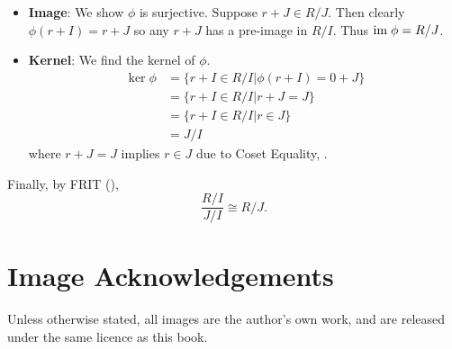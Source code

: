 \begin{questions}
\begin{partquestions}{\roman*}
\begin{itemize}
            \item \textbf{Image}: We show $\phi$ is surjective. Suppose $r + J \in R/J$. Then clearly $\phi(r+I) = r+J$ so any $r+J$ has a pre-image in $R/I$. Thus $\mathrm{im}\;\phi = R/J$.
            
            \item \textbf{Kernel}: We find the kernel of $\phi$.
            \begin{align*}
                \ker\phi &= \{r+I \in R/I \vert \phi(r+I) = 0+J\}\\
                &= \{r+I \in R/I \vert r+J = J\}\\
                &= \{r+I \in R/I \vert r \in J\}\\
                &= J/I
            \end{align*}
            where $r+J=J$ implies $r \in J$ due to Coset Equality, .
        \end{itemize}
        Finally, by FRIT (),
        \[
            \frac{R/I}{J/I} \cong R/J.
        \]
    \end{partquestions}
\end{questions}

\chapter{Image Acknowledgements}
Unless otherwise stated, all images are the author's own work, and are released under the same licence as this book.

\printbibliography[heading=bibintoc, title={References and Bibliography}]
\printindex


